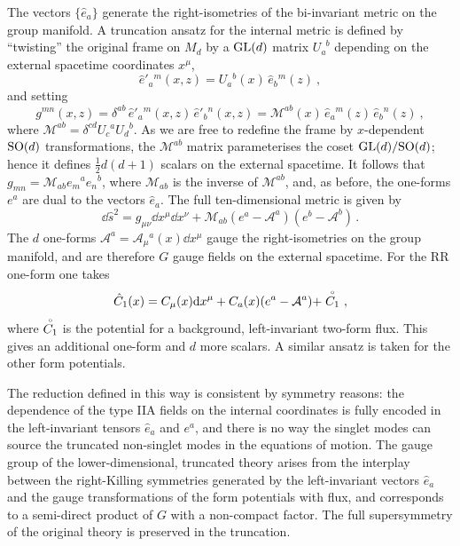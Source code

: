 \documentclass[debug]{phd}
\begin{document}
				The vectors $\{\hat{e}_a\}$ generate the right-isometries of the bi-invariant metric on the group manifold. 
				A truncation ansatz for the internal metric is defined by ``twisting'' the original frame on $M_d$ by a $\mathrm{GL}(d)$ matrix $U_a^{\phantom{a}b}$ depending on the external spacetime coordinates $x^\mu$,
						\begin{equation}
							\hat{e}'_a{}^m(x,z) = U_a{}^b(x)\, \hat{e}_b{}^m(z)\ ,
						\end{equation}
				and setting
						\begin{equation}
							g^{mn}(x,z) = \delta^{ab}\, \hat{e}'_a{}^m(x,z) \,\hat{e}'_b{}^n(x,z) = \mathcal{M}^{ab}(x) \,\hat{e}_a{}^m(z) \,\hat{e}_b{}^n(z)\ ,
						\end{equation}
				where $\mathcal{M}^{ab} = \delta^{cd} U_c{}^a U_d{}^b$. 
				As we are free to redefine the frame by $x$-dependent $\mathrm{SO}(d)$ transformations, the $\mathcal{M}^{ab}$ matrix parameterises the coset $\mathrm{GL}(d)/\mathrm{SO}(d)$; hence it defines $\frac{1}{2}d(d+1)$ scalars on the external spacetime. 
				It follows that $g_{mn} =\mathcal{M}_{ab} e_m{}^a e_n{}^b$, where $\mathcal{M}_{ab}$ is the inverse of $\mathcal{M}^{ab}$, and, as before, the one-forms $e^a$ are dual to the vectors $\hat{e}_a$. 
				The full ten-dimensional metric is given by
						\begin{equation}
							\dd \hat{s}^2 = g_{\mu\nu}\dd{x}^\mu\dd{x}^\nu + \mathcal{M}_{ab} (e^a - \mathcal{A}^a)(e^b - \mathcal{A}^b)\,.
						\end{equation}
				The $d$ one-forms $\mathcal{A}^a=\mathcal{A}_\mu{}^a(x)\dd{x}^\mu$ gauge the right-isometries on the group manifold, and are therefore $G$ gauge fields on the external spacetime.
				For the RR one-form one takes
						\begin{equation}
							\hat{C}_1(x) = C_\mu(x) \mathrm{d}{x}^\mu + C_a(x) (e^a - \mathcal{A}^a) + \stackrel{\scriptscriptstyle{\circ}}{C_1}\ ,
						\end{equation}
				where $\stackrel{\scriptscriptstyle{\circ}}{C_1}$ is the potential for a background, left-invariant two-form flux. 
				This gives an additional one-form and $d$ more scalars. 
				A similar ansatz is taken for the other form potentials.
 
				The reduction defined in this way is consistent by symmetry reasons: the dependence of the type IIA fields on the internal coordinates is fully encoded in the left-invariant tensors $\hat{e}_a$ and $e^a$, and there is no way the singlet modes can source the truncated non-singlet modes in the equations of motion.
				The gauge group of the lower-dimensional, truncated theory arises from the interplay between the right-Killing symmetries generated by the left-invariant vectors $\hat{e}_a$ and the gauge transformations of the form potentials with flux, and corresponds to a semi-direct product of $G$ with a non-compact factor. 
				The full supersymmetry of the original theory is preserved in the truncation.
				
\end{document}
